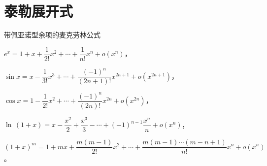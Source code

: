 \documentclass[UTF8]{ctexart}
\begin{document}
\section{泰勒展开式}
带佩亚诺型余项的麦克劳林公式
  \begin{tabenum}[(1)] \qquad \qquad
    \item $e^{x}=1+x+ \dfrac{1}{2!}x^{2} +\cdots + \dfrac{1}{n!}x^{n} +o(x^{n})$，\\
    \item $\sin x=x-\dfrac{1}{3!}x^{3}+\cdots + \dfrac{(-1)^{n}}{(2n+1)!}x^{2n+1} +o(x^{2n+1})$，\\
    \item $\cos x=1-\dfrac{1}{2!}x^{2} +\cdots + \dfrac{(-1)^{n}}{(2n)!}x^{2n} +o(x^{2n})$，\\
    \item $\ln \,(1+x)=x-\dfrac{x^{2}}{2}+ \dfrac{x^{3}}{3} -\cdots + (-1)^{n-1}\dfrac{x^{n}}{n} +o(x^{n})$，\\
    \item $(1+x)^{m}=1+mx+\dfrac{m(m-1)}{2!}x^{2} +\cdots + \dfrac{m(m-1)\cdots (m-n+1)}{n!}x^{n} +o(x^{n})$。
  \end{tabenum}
\end{document}
